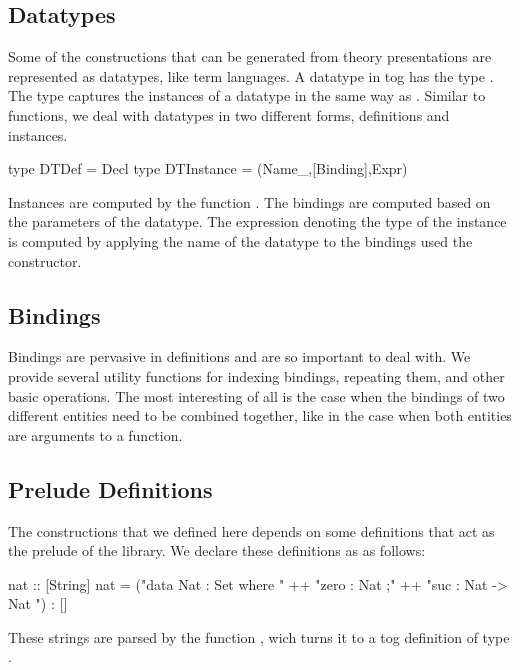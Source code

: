 \subsection{Datatypes}
\label{subsec:generation:datatypes}
Some of the constructions that can be generated from theory presentations are represented as datatypes, like term languages. A datatype in tog has the type . The type  captures the instances of a datatype in the same way as .
Similar to functions, we deal with datatypes in two different forms, definitions and instances. 
\begin{hscode}
type DTDef = Decl
type DTInstance = (Name_,[Binding],Expr) 
\end{hscode}
Instances are computed by the function . The bindings are computed based on the parameters of the datatype. The expression denoting the type of the instance is computed by applying the name of the datatype to the bindings used the  constructor. 

\begin{comment}
\subsection{Renaming}
\label{subsec:generation:renaming}
In multiple positions what we do is substitution, i.e. traverse the datatype and replace the occurence of one variable with another. 

\end{comment}

\subsection{Bindings}
\label{subsec:generation:bindings}
Bindings are pervasive in definitions and are so important to deal with. We provide several utility functions for indexing bindings, repeating them, and other basic operations. 
The most interesting of all is the case when the bindings of two different entities need to be combined together, like in the case when both entities are arguments to a function.  

\subsection{Prelude Definitions}
\label{subsec:generation:prelude}
The constructions that we defined here depends on some definitions that act as the prelude of the library. We declare these definitions as \lstmath{[String]} as follows: 
\begin{hscode}
nat :: [String]
nat =
  ("data Nat : Set where { " ++ 
     "zero : Nat ;" ++ 
     "suc  : Nat -> Nat }") : []
\end{hscode}
These strings are parsed by the function , wich turns it to a tog definition of type . 

